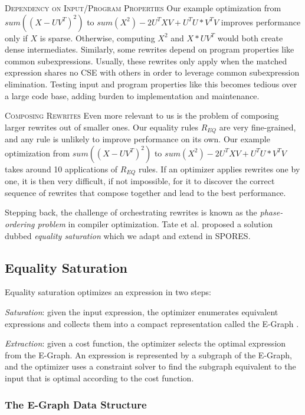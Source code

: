 \textsc{Dependency on Input/Program Properties} Our example optimization from 
$sum((X-UV^T)^2)$  to $sum(X^2) -2U^TXV + U^TU*V^TV$
improves performance only if $X$ is sparse. Otherwise,
computing $X^2$ and $X*UV^T$ would both create dense intermediates. Similarly,
some rewrites depend on program properties like common subexpressions. Usually,
these rewrites only apply when the matched expression shares no CSE with others
in order to leverage common subexpression elimination. Testing input and program
properties like this becomes tedious over a large code base, 
 adding burden to implementation and maintenance.

\textsc{Composing Rewrites} Even more relevant to us is the problem of composing
larger rewrites out of smaller ones. Our equality rules $R_{EQ}$ are very
fine-grained, and any rule is unlikely to improve performance on its own. 
Our example optimization from $sum((X-UV^T)^2)$ to $sum(X^2) - 2U^TXV + U^TU * V^TV$ 
takes around 10 applications of $R_{EQ}$ rules. 
 If an optimizer applies rewrites one by one, it is
then very difficult, if not impossible, for it to discover the correct sequence
of rewrites that compose together and lead to the best performance.

Stepping back, the challenge of orchestrating rewrites is known as the
\emph{phase-ordering problem} in compiler optimization. Tate
et al. \cite{DBLP:journals/corr/abs-1012-1802} proposed a solution  dubbed
\textit{equality saturation} which we adapt and extend in SPORES.

\subsection{Equality Saturation}

Equality saturation optimizes an expression in two steps:

\textit{Saturation}: given the input expression, the optimizer  enumerates
equivalent expressions and collects them into a compact representation called
the E-Graph \cite{10.5555/909447}.

\textit{Extraction}: given a cost function, the optimizer selects the optimal
expression from the E-Graph. An expression is represented by a subgraph of the
E-Graph, and the optimizer uses a constraint solver to find the subgraph
equivalent to the input that is optimal according to the cost function.

\subsubsection*{The E-Graph Data Structure}

